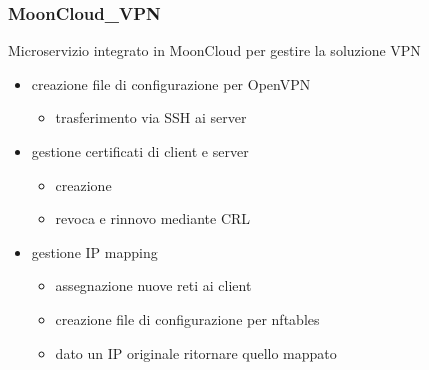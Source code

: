 \begin{frame}
    \frametitle{MoonCloud\_VPN}
    \alert{Microservizio} integrato in MoonCloud per gestire la soluzione VPN
    \begin{itemize}
        \item creazione file di \alert{configurazione} per \alert{OpenVPN}
        \begin{itemize}
            \item \alert{trasferimento} via SSH ai server
        \end{itemize}
        \item gestione \alert{certificati} di client e server
        \begin{itemize}
            \item creazione
            \item revoca e rinnovo mediante \alert{CRL}
        \end{itemize}
        \item gestione \alert{IP mapping}
        \begin{itemize}
            \item assegnazione nuove reti ai client
            \item creazione file di \alert{configurazione} per \alert{nftables}
            \item dato un IP originale ritornare quello mappato
        \end{itemize}
    \end{itemize}
\end{frame}

